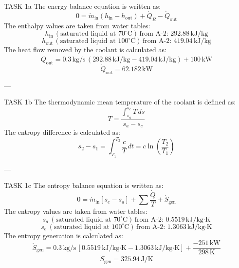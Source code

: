 TASK 1a  
The energy balance equation is written as:  
\[
0 = \dot{m}_{\text{in}} (h_{\text{in}} - h_{\text{out}}) + \dot{Q}_R - \dot{Q}_{\text{out}}
\]  
The enthalpy values are taken from water tables:  
\[
h_{\text{in}} \, (\text{saturated liquid at } 70^\circ\text{C}) \, \text{from A-2: } 292.88 \, \text{kJ/kg}
\]  
\[
h_{\text{out}} \, (\text{saturated liquid at } 100^\circ\text{C}) \, \text{from A-2: } 419.04 \, \text{kJ/kg}
\]  
The heat flow removed by the coolant is calculated as:  
\[
\dot{Q}_{\text{out}} = 0.3 \, \text{kg/s} \, (292.88 \, \text{kJ/kg} - 419.04 \, \text{kJ/kg}) + 100 \, \text{kW}
\]  
\[
\dot{Q}_{\text{out}} = 62.182 \, \text{kW}
\]  

---

TASK 1b  
The thermodynamic mean temperature of the coolant is defined as:  
\[
T = \frac{\int_{s_a}^{s_e} T \, ds}{s_a - s_e}
\]  
The entropy difference is calculated as:  
\[
s_2 - s_1 = \int_{T_1}^{T_2} \frac{c}{T} \, dt = c \ln \left( \frac{T_2}{T_1} \right)
\]  

---

TASK 1c  
The entropy balance equation is written as:  
\[
0 = \dot{m}_{\text{in}} [s_e - s_a] + \sum \frac{\dot{Q}}{T} + \dot{S}_{\text{gen}}
\]  
The entropy values are taken from water tables:  
\[
s_a \, (\text{saturated liquid at } 70^\circ\text{C}) \, \text{from A-2: } 0.5519 \, \text{kJ/kg·K}
\]  
\[
s_e \, (\text{saturated liquid at } 100^\circ\text{C}) \, \text{from A-2: } 1.3063 \, \text{kJ/kg·K}
\]  
The entropy generation is calculated as:  
\[
\dot{S}_{\text{gen}} = 0.3 \, \text{kg/s} \, [0.5519 \, \text{kJ/kg·K} - 1.3063 \, \text{kJ/kg·K}] + \frac{-251 \, \text{kW}}{298 \, \text{K}}
\]  
\[
\dot{S}_{\text{gen}} = 325.94 \, \text{J/K}
\]